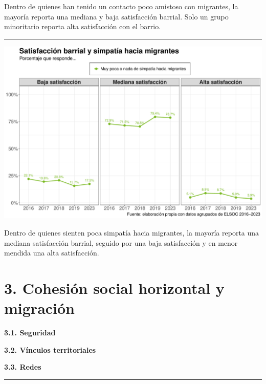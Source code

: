 \documentclass[
  spanish,
  letterpaper,
  DIV=11,
  numbers=noendperiod,
  oneside]{scrartcl}
\begin{document}
Dentro de quienes han tenido un contacto poco amistoso con migrantes, la
mayoría reporta una mediana y baja satisfacción barrial. Solo un grupo
minoritario reporta alta satisfacción con el barrio.

\begin{center}\rule{0.5\linewidth}{0.5pt}\end{center}

\begin{center}
\includegraphics[width=1\linewidth,height=\textheight,keepaspectratio]{cep_2025_files/figure-pdf/unnamed-chunk-9-1.pdf}
\end{center}

Dentro de quienes sienten poca simpatía hacia migrantes, la mayoría
reporta una mediana satisfacción barrial, seguido por una baja
satisfacción y en menor mendida una alta satisfacción.

\section{3. Cohesión social horizontal y
migración}\label{cohesiuxf3n-social-horizontal-y-migraciuxf3n-3}

{\textbf{3.1. Seguridad}}

{\textbf{3.2. Vínculos territoriales}}

{\textbf{3.3. Redes}}

\begin{center}\rule{0.5\linewidth}{0.5pt}\end{center}
\end{document}
